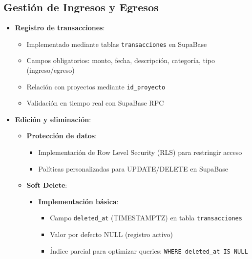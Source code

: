 \subsection{Gestión de Ingresos y Egresos}
\begin{itemize}
    \item \textbf{Registro de transacciones}:
    \begin{itemize}
        \item Implementado mediante tablas \texttt{transacciones} en SupaBase
        \item Campos obligatorios: monto, fecha, descripción, categoría, tipo (ingreso/egreso)
        \item Relación con proyectos mediante \texttt{id\_proyecto}
        \item Validación en tiempo real con SupaBase RPC
    \end{itemize}
    
\item \textbf{Edición y eliminación}:
\begin{itemize}
    \item \textbf{Protección de datos}:
    \begin{itemize}
        \item Implementación de Row Level Security (RLS) para restringir acceso
        \item Políticas personalizadas para UPDATE/DELETE en SupaBase
    \end{itemize}
    
\item \textbf{Soft Delete}:
\begin{itemize}
    \item \textbf{Implementación básica}:
    \begin{itemize}
        \item Campo \texttt{deleted\_at} (TIMESTAMPTZ) en tabla \texttt{transacciones}
        \item Valor por defecto NULL (registro activo)
        \item Índice parcial para optimizar queries: \texttt{WHERE deleted\_at IS NULL}
    \end{itemize}
    

\end{itemize}
\end{itemize}
\end{itemize}

